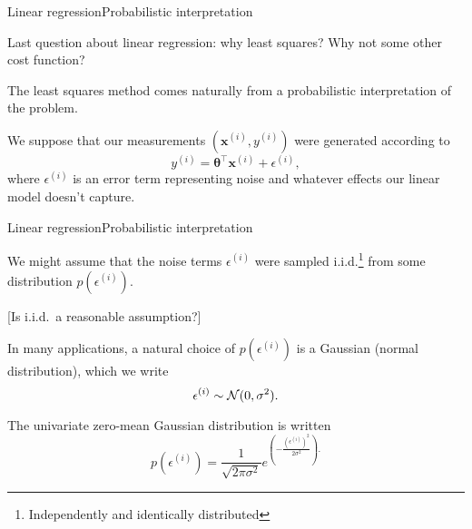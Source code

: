 \documentclass{beamer}
\renewcommand{\vec}[1]{\boldsymbol{#1}}
\begin{document}
\begin{frame}{Linear regression}{Probabilistic interpretation}

  Last question about linear regression: \alert{why least squares}?
  Why not some other cost function?

  \medskip

  The least squares method comes naturally from a probabilistic
  interpretation of the problem.

  \medskip

  We suppose that our measurements $(\vec{x}^{(i)},y^{(i)})$ were
  \alert{generated} according to
  \[ y^{(i)} = \vec{\theta}^\top \vec{x}^{(i)} + \epsilon^{(i)}, \]
  where $\epsilon^{(i)}$ is an \alert{error} term representing noise
  and whatever effects our linear model doesn't capture.

\end{frame}


\begin{frame}{Linear regression}{Probabilistic interpretation}

  We might assume that the noise terms $\epsilon^{(i)}$
  were sampled i.i.d.\footnote{Independently and identically distributed}
  from some distribution $p(\epsilon^{(i)})$.

  \medskip

  [Is i.i.d.\ a reasonable assumption?]

  \medskip

  In many applications, a natural choice of $p(\epsilon^{(i)})$ is a
  \alert{Gaussian} (normal distribution), which we write
  \[ \epsilon^{(i)} \sim {\cal N}(0, \sigma^2). \]

  \medskip

  The univariate zero-mean Gaussian distribution is written
  \[ p(\epsilon^{(i)}) = \frac{1}{\sqrt{2\pi\sigma^2}} e^{\left( -\frac{(\epsilon^{(i)})^2}{2\sigma^2} \right) .} \]
  
\end{frame}
\end{document}
